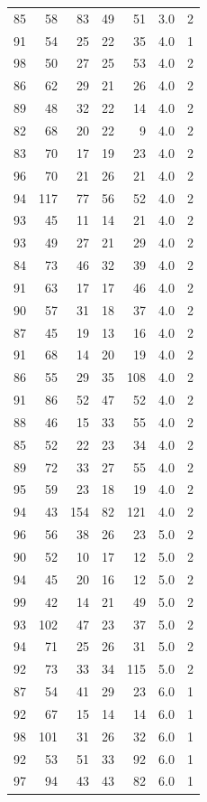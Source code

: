 \documentclass[
  11pt,
  a4paper,
]{scrartcl}
\begin{document}
\begin{longtable}[]{@{}rrrrrrl@{}}
85 & 58 & 83 & 49 & 51 & 3.0 & 2 \\
91 & 54 & 25 & 22 & 35 & 4.0 & 1 \\
98 & 50 & 27 & 25 & 53 & 4.0 & 2 \\
86 & 62 & 29 & 21 & 26 & 4.0 & 2 \\
89 & 48 & 32 & 22 & 14 & 4.0 & 2 \\
82 & 68 & 20 & 22 & 9 & 4.0 & 2 \\
83 & 70 & 17 & 19 & 23 & 4.0 & 2 \\
96 & 70 & 21 & 26 & 21 & 4.0 & 2 \\
94 & 117 & 77 & 56 & 52 & 4.0 & 2 \\
93 & 45 & 11 & 14 & 21 & 4.0 & 2 \\
93 & 49 & 27 & 21 & 29 & 4.0 & 2 \\
84 & 73 & 46 & 32 & 39 & 4.0 & 2 \\
91 & 63 & 17 & 17 & 46 & 4.0 & 2 \\
90 & 57 & 31 & 18 & 37 & 4.0 & 2 \\
87 & 45 & 19 & 13 & 16 & 4.0 & 2 \\
91 & 68 & 14 & 20 & 19 & 4.0 & 2 \\
86 & 55 & 29 & 35 & 108 & 4.0 & 2 \\
91 & 86 & 52 & 47 & 52 & 4.0 & 2 \\
88 & 46 & 15 & 33 & 55 & 4.0 & 2 \\
85 & 52 & 22 & 23 & 34 & 4.0 & 2 \\
89 & 72 & 33 & 27 & 55 & 4.0 & 2 \\
95 & 59 & 23 & 18 & 19 & 4.0 & 2 \\
94 & 43 & 154 & 82 & 121 & 4.0 & 2 \\
96 & 56 & 38 & 26 & 23 & 5.0 & 2 \\
90 & 52 & 10 & 17 & 12 & 5.0 & 2 \\
94 & 45 & 20 & 16 & 12 & 5.0 & 2 \\
99 & 42 & 14 & 21 & 49 & 5.0 & 2 \\
93 & 102 & 47 & 23 & 37 & 5.0 & 2 \\
94 & 71 & 25 & 26 & 31 & 5.0 & 2 \\
92 & 73 & 33 & 34 & 115 & 5.0 & 2 \\
87 & 54 & 41 & 29 & 23 & 6.0 & 1 \\
92 & 67 & 15 & 14 & 14 & 6.0 & 1 \\
98 & 101 & 31 & 26 & 32 & 6.0 & 1 \\
92 & 53 & 51 & 33 & 92 & 6.0 & 1 \\
97 & 94 & 43 & 43 & 82 & 6.0 & 1 \\

\end{longtable}
\end{document}
